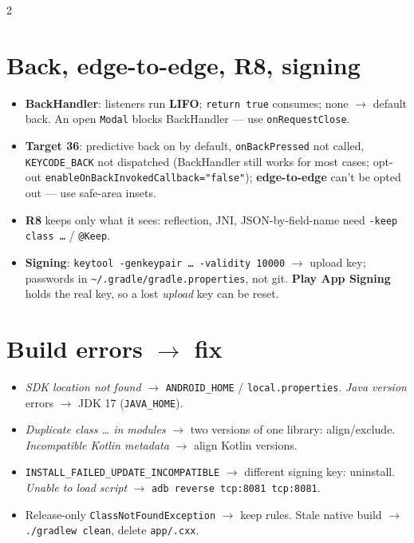 \documentclass[8pt]{extarticle}
\begin{document}
\begin{multicols}{2}
\section{Back, edge-to-edge, R8, signing}
\begin{itemize}\raggedright
  \item \textbf{BackHandler}: listeners run \textbf{LIFO}; \texttt{return true} consumes;
        none $\to$ default back. An open \texttt{Modal} blocks BackHandler — use
        \texttt{onRequestClose}.
  \item \textbf{Target 36}: predictive back on by default, \texttt{onBackPressed} not called,
        \texttt{KEYCODE\_BACK} not dispatched (BackHandler still works for most cases;
        opt-out \texttt{enableOnBackInvokedCallback="false"}); \textbf{edge-to-edge}
        can't be opted out — use safe-area insets.
  \item \textbf{R8} keeps only what it sees: reflection, JNI, JSON-by-field-name need
        \texttt{-keep class …} / \texttt{@Keep}.
  \item \textbf{Signing}: \texttt{keytool -genkeypair … -validity 10000} $\to$ upload key;
        passwords in \texttt{\~{}/.gradle/gradle.properties}, not git. \textbf{Play App
        Signing} holds the real key, so a lost \emph{upload} key can be reset.
\end{itemize}

\section{Build errors $\to$ fix}
\begin{itemize}\raggedright
  \item \emph{SDK location not found} $\to$ \texttt{ANDROID\_HOME} / \texttt{local.properties}.
        \emph{Java version} errors $\to$ JDK 17 (\texttt{JAVA\_HOME}).
  \item \emph{Duplicate class … in modules} $\to$ two versions of one library: align/exclude.
        \emph{Incompatible Kotlin metadata} $\to$ align Kotlin versions.
  \item \texttt{INSTALL\_FAILED\_UPDATE\_INCOMPATIBLE} $\to$ different signing key: uninstall.
        \emph{Unable to load script} $\to$ \texttt{adb reverse tcp:8081 tcp:8081}.
  \item Release-only \texttt{ClassNotFoundException} $\to$ keep rules. Stale native build
        $\to$ \texttt{./gradlew clean}, delete \texttt{app/.cxx}.
\end{itemize}


\end{multicols}
\end{document}
